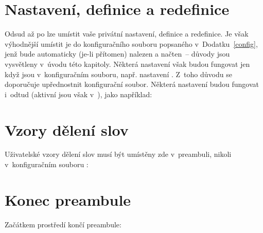 \section{Nastavení, definice a redefinice}\label{settdefredef}%

Odsud až po \verb!! lze umístit vaše privátní nastavení,
  definice a redefinice. Je však výhodnější umístit je do konfiguračního
  souboru  popsaného v~Dodatku~\ref{config}, jenž bude
  automaticky (je-li přítomen) nalezen a načten~-- důvody jsou vysvětleny
  v~úvodu této kapitoly. Některá nastavení však budou fungovat jen když jsou
  v~konfiguračním souboru, např. nastavení .  Z~toho důvodu se doporučuje upřednostnit konfigurační
  soubor. Některá nastavení budou fungovat i~odtud (aktivní jsou však
  v~), jako například:


\section{Vzory dělení slov}\label{userhyph}%

Uživatelské vzory dělení slov musí být umístěny zde v~preambuli, nikoli
v~konfiguračním souboru :


\section{Konec preambule}\label{preambend}%

Začátkem prostředí  končí preambule:


\endinput

